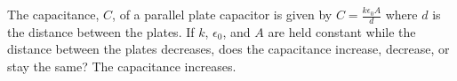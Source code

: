 {The capacitance, $C$, of a parallel plate capacitor is given by $C=\frac{k \epsilon_0 A}{d}$ where $d$ is the distance between the plates. If $k$, $\epsilon_0$, and $A$ are held constant while the distance between the plates decreases, does the capacitance increase, decrease, or stay the same?}
{The capacitance increases.}
